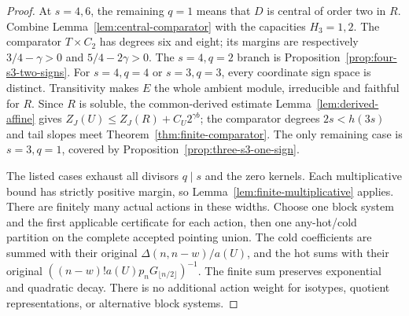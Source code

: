 \begin{proof}
At $s=4,6$, the remaining $q=1$ means that $D$ is central of
order two in $R$. Combine Lemma~\ref{lem:central-comparator}
with the capacities $H_3=1,2$. The comparator $T\times C_2$
has degrees six and eight; its margins are respectively
$3/4-\gamma>0$ and $5/4-2\gamma>0$.
The $s=4,q=2$ branch is Proposition~\ref{prop:four-s3-two-signs}.
For $s=4,q=4$ or $s=3,q=3$, every coordinate sign space is
distinct. Transitivity makes $E$ the whole ambient module,
irreducible and faithful for $R$. Since $R$ is soluble, the
common-derived estimate Lemma~\ref{lem:derived-affine} gives
$Z_J(U)\leq Z_J(R)+C_U2^{\gamma b}$; the comparator degrees
$2s<h(3s)$ and tail slopes meet Theorem~\ref{thm:finite-comparator}.
The only remaining case is $s=3,q=1$, covered by
Proposition~\ref{prop:three-s3-one-sign}.

The listed cases exhaust all divisors $q\mid s$ and the zero
kernels. Each multiplicative bound has strictly positive margin,
so Lemma~\ref{lem:finite-multiplicative} applies. There are finitely
many actual actions in these widths. Choose one block system and
the first applicable certificate for each action, then one
any-hot/cold partition on the complete accepted pointing union.
The cold coefficients are summed with their original
$\Delta(n,n-w)/a(U)$, and the hot sums with their original
$((n-w)!a(U)p_nG_{\lfloor n/2\rfloor})^{-1}$.
The finite sum preserves exponential and quadratic decay.
There is no additional action weight for isotypes, quotient
representations, or alternative block systems.
\end{proof}
